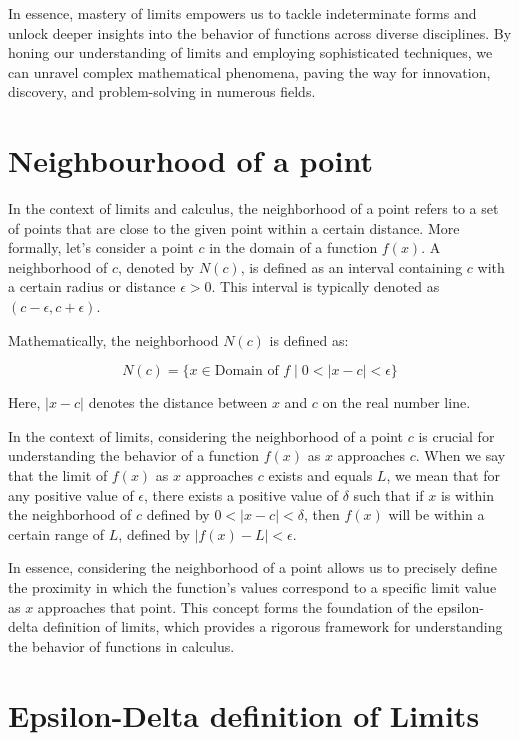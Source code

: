 In essence, mastery of limits empowers us to tackle indeterminate forms and unlock deeper insights into the behavior of functions across diverse disciplines. By honing our understanding of limits and employing sophisticated techniques, we can unravel complex mathematical phenomena, paving the way for innovation, discovery, and problem-solving in numerous fields.


\section{Neighbourhood of a point}

In the context of limits and calculus, the neighborhood of a point refers to a set of points that are close to the given point within a certain distance. More formally, let's consider a point \( c \) in the domain of a function \( f(x) \). A neighborhood of \( c \), denoted by \( N(c) \), is defined as an interval containing \( c \) with a certain radius or distance \( \epsilon > 0 \). This interval is typically denoted as \( (c - \epsilon, c + \epsilon) \).

Mathematically, the neighborhood \( N(c) \) is defined as:

\[ N(c) = \{ x \in \text{Domain of } f \mid 0 < |x - c| < \epsilon \} \]

Here, \( |x - c| \) denotes the distance between \( x \) and \( c \) on the real number line.

In the context of limits, considering the neighborhood of a point \( c \) is crucial for understanding the behavior of a function \( f(x) \) as \( x \) approaches \( c \). When we say that the limit of \( f(x) \) as \( x \) approaches \( c \) exists and equals \( L \), we mean that for any positive value of \( \epsilon \), there exists a positive value of \( \delta \) such that if \( x \) is within the neighborhood of \( c \) defined by \( 0 < |x - c| < \delta \), then \( f(x) \) will be within a certain range of \( L \), defined by \( |f(x) - L| < \epsilon \).

In essence, considering the neighborhood of a point allows us to precisely define the proximity in which the function's values correspond to a specific limit value as \( x \) approaches that point. This concept forms the foundation of the epsilon-delta definition of limits, which provides a rigorous framework for understanding the behavior of functions in calculus.


\section{Epsilon-Delta definition of Limits}

